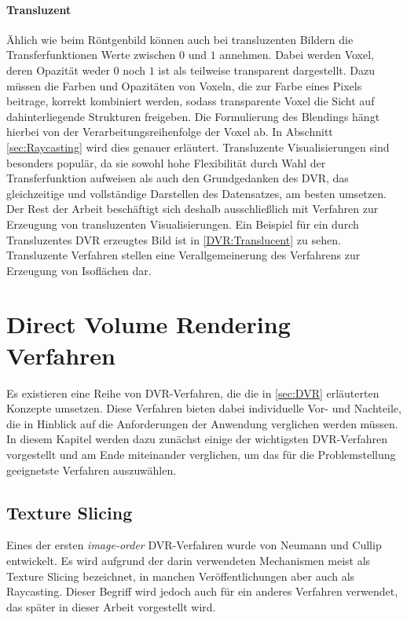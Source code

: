 \documentclass[a4paper,fontsize=12pt,toc=bib,parskip=half,ngerman]{scrartcl}
\begin{document}
\paragraph{Transluzent}
\"Ahlich wie beim R\"ontgenbild k\"onnen auch bei transluzenten Bildern die Transferfunktionen Werte zwischen $0$ und $1$ annehmen. Dabei werden Voxel, deren Opazit\"at weder $0$ noch $1$ ist als teilweise transparent dargestellt. Dazu m\"ussen die Farben und Opazit\"aten von Voxeln, die zur Farbe eines Pixels beitrage, korrekt kombiniert werden, sodass transparente Voxel die Sicht auf dahinterliegende Strukturen freigeben. Die Formulierung des Blendings h\"angt hierbei von der Verarbeitungsreihenfolge der Voxel ab. In Abschnitt \ref{sec:Raycasting} wird dies genauer erl\"autert. Transluzente Visualisierungen sind besonders popul\"ar, da sie sowohl hohe Flexibilit\"at durch Wahl der Transferfunktion aufweisen als auch den Grundgedanken des DVR, das gleichzeitige und vollst\"andige Darstellen des Datensatzes, am besten umsetzen. Der Rest der Arbeit besch\"aftigt sich deshalb ausschlie{\ss}lich mit Verfahren zur Erzeugung von transluzenten Visualisierungen. Ein Beispiel f\"ur ein durch Transluzentes DVR erzeugtes Bild ist in \cref{DVR:Translucent} zu sehen. Transluzente Verfahren stellen eine Verallgemeinerung des Verfahrens zur Erzeugung von Isofl\"achen dar.

\section{Direct Volume Rendering Verfahren}
Es existieren eine Reihe von DVR-Verfahren, die die in \cref{sec:DVR} erl\"auterten Konzepte umsetzen. Diese Verfahren bieten dabei individuelle Vor- und Nachteile, die in Hinblick auf die Anforderungen der Anwendung verglichen werden m\"ussen. In diesem Kapitel werden dazu zun\"achst einige der wichtigsten DVR-Verfahren vorgestellt und am Ende miteinander verglichen, um das f\"ur die Problemstellung geeignetste Verfahren auszuw\"ahlen. 

\subsection{Texture Slicing}
\label{sec:TextureSlicing}
Eines der ersten \textit{image-order} DVR-Verfahren wurde von Neumann und Cullip \cite{cullip1993accelerating} entwickelt. Es wird aufgrund der darin verwendeten Mechanismen meist als Texture Slicing bezeichnet, in manchen Ver\"offentlichungen aber auch als Raycasting. Dieser Begriff wird jedoch auch f\"ur ein anderes Verfahren verwendet, das sp\"ater in dieser Arbeit vorgestellt wird.
\end{document}
